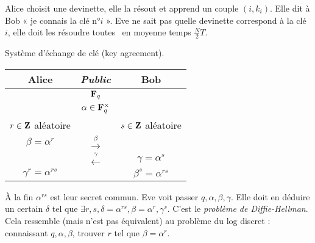 	Alice choisit une devinette, elle la résout et apprend un couple $(i,k_i)$.
	Elle dit à Bob « je connais la clé n°$i$ ».
	Eve ne sait pas quelle devinette correspond à la clé $i$, elle doit les résoudre toutes \textrightarrow\ en moyenne temps $\frac{N}{2} T$.
	
	\begin{ex}
		Système d'échange de clé (key agreement).
		
		\begin{tabular}{ccc}
			Alice & \textit{Public} & Bob \\
			\hline
			 & $\mathbf{F}_q$ & \\
			 & $\alpha \in \mathbf{F}_q^\times$ & \\
			$r \in \mathbf{Z}$ aléatoire & & $s \in \mathbf{Z}$ aléatoire \\
			$\beta = \alpha^r$ & $\overset{\beta}{\longrightarrow} $ & \\
			 & $\overset{\gamma}{\longleftarrow}$ & $\gamma = \alpha^s$ \\
			$\gamma^r = \alpha^{rs}$ & & $\beta^s = \alpha^{rs}$
		\end{tabular}
		
		À la fin $\alpha^{rs}$ est leur secret commun.
		Eve voit passer $q,\alpha,\beta,\gamma$.
		Elle doit en déduire un certain $\delta$ tel que $\exists r,s, \delta = \alpha^{rs}, \beta = \alpha^r, \gamma^s$.
		C'est le \textit{problème de Diffie-Hellman}.
		Cela ressemble (mais n'est pas équivalent) au problème du log discret : connaissant $q,\alpha,\beta$, trouver $r$ tel que $\beta = \alpha^r$.
	\end{ex}
	
